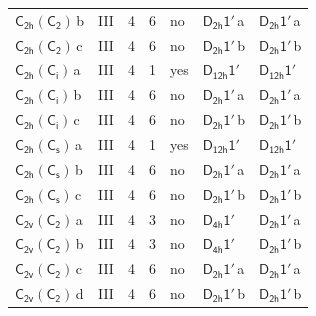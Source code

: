 \documentclass[10pt,a4paper]{article}
\numberwithin{equation}{section}
\newcommand{\grp}[1]{\mathsf{#1}}
\newcommand{\clsletter}[1]{\,{\scriptsize\color{black!55}#1}}
\begin{document}
{\begin{longtable}{@{}llrrlll@{}}
\href{C2h-C2.pdf}{$\grp{C_{2h}}(\grp{C_{2}})$}\clsletter{b} & III & 4 & 6 & no & \href{D2h-1p.pdf}{$\grp{D_{2h}1'}$}\clsletter{a} & \href{D2h-1p.pdf}{$\grp{D_{2h}1'}$}\clsletter{a}\\
\href{C2h-C2.pdf}{$\grp{C_{2h}}(\grp{C_{2}})$}\clsletter{c} & III & 4 & 6 & no & \href{D2h-1p.pdf}{$\grp{D_{2h}1'}$}\clsletter{b} & \href{D2h-1p.pdf}{$\grp{D_{2h}1'}$}\clsletter{b}\\
\href{C2h-S2.pdf}{$\grp{C_{2h}}(\grp{C_{i}})$}\clsletter{a} & III & 4 & 1 & yes & \href{D12h-1p.pdf}{$\grp{D_{12h}1'}$} & \href{D12h-1p.pdf}{$\grp{D_{12h}1'}$}\\
\href{C2h-S2.pdf}{$\grp{C_{2h}}(\grp{C_{i}})$}\clsletter{b} & III & 4 & 6 & no & \href{D2h-1p.pdf}{$\grp{D_{2h}1'}$}\clsletter{a} & \href{D2h-1p.pdf}{$\grp{D_{2h}1'}$}\clsletter{a}\\
\href{C2h-S2.pdf}{$\grp{C_{2h}}(\grp{C_{i}})$}\clsletter{c} & III & 4 & 6 & no & \href{D2h-1p.pdf}{$\grp{D_{2h}1'}$}\clsletter{b} & \href{D2h-1p.pdf}{$\grp{D_{2h}1'}$}\clsletter{b}\\
\href{C2h-C1v.pdf}{$\grp{C_{2h}}(\grp{C_{s}})$}\clsletter{a} & III & 4 & 1 & yes & \href{D12h-1p.pdf}{$\grp{D_{12h}1'}$} & \href{D12h-1p.pdf}{$\grp{D_{12h}1'}$}\\
\href{C2h-C1v.pdf}{$\grp{C_{2h}}(\grp{C_{s}})$}\clsletter{b} & III & 4 & 6 & no & \href{D2h-1p.pdf}{$\grp{D_{2h}1'}$}\clsletter{a} & \href{D2h-1p.pdf}{$\grp{D_{2h}1'}$}\clsletter{a}\\
\href{C2h-C1v.pdf}{$\grp{C_{2h}}(\grp{C_{s}})$}\clsletter{c} & III & 4 & 6 & no & \href{D2h-1p.pdf}{$\grp{D_{2h}1'}$}\clsletter{b} & \href{D2h-1p.pdf}{$\grp{D_{2h}1'}$}\clsletter{b}\\
\href{C2v-C2.pdf}{$\grp{C_{2v}}(\grp{C_{2}})$}\clsletter{a} & III & 4 & 3 & no & \href{D4h-1p.pdf}{$\grp{D_{4h}1'}$} & \href{D2h-1p.pdf}{$\grp{D_{2h}1'}$}\clsletter{a}\\
\href{C2v-C2.pdf}{$\grp{C_{2v}}(\grp{C_{2}})$}\clsletter{b} & III & 4 & 3 & no & \href{D4h-1p.pdf}{$\grp{D_{4h}1'}$} & \href{D2h-1p.pdf}{$\grp{D_{2h}1'}$}\clsletter{b}\\
\href{C2v-C2.pdf}{$\grp{C_{2v}}(\grp{C_{2}})$}\clsletter{c} & III & 4 & 6 & no & \href{D2h-1p.pdf}{$\grp{D_{2h}1'}$}\clsletter{a} & \href{D2h-1p.pdf}{$\grp{D_{2h}1'}$}\clsletter{a}\\
\href{C2v-C2.pdf}{$\grp{C_{2v}}(\grp{C_{2}})$}\clsletter{d} & III & 4 & 6 & no & \href{D2h-1p.pdf}{$\grp{D_{2h}1'}$}\clsletter{b} & \href{D2h-1p.pdf}{$\grp{D_{2h}1'}$}\clsletter{b}\\

\end{longtable}}
\end{document}
